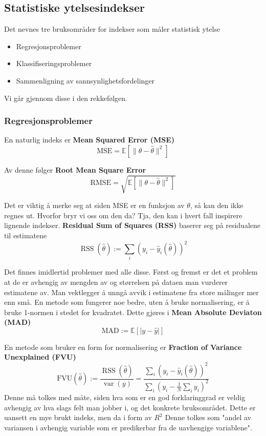 \subsection{Statistiske ytelsesindekser}
Det nevnes tre bruksområder for indekser som måler statistisk ytelse
\begin{itemize}
\item Regresjonsproblemer
\item Klassifiseringsproblemer
\item Sammenligning av sannsynlighetsfordelinger
\end{itemize}
Vi går gjennom disse i den rekkefølgen.

\subsubsection{Regresjonsproblemer}
En naturlig indeks er \textbf{Mean Squared Error (MSE)}
\begin{equation}
\textrm{MSE} = \mathbb{E}\left[\|\theta-\widehat{\theta}\|^{2}\right]
\end{equation}

Av denne følger \textbf{Root Mean Square Error}
\begin{equation}
\textrm{RMSE} = \sqrt{\mathbb{E}\left[\|\theta-\widehat{\theta}\|^{2}\right]}
\end{equation}

Det er viktig å merke seg at siden MSE er en funksjon av $\theta$, så kan den ikke regnes ut. Hvorfor bryr vi oss om den da? Tja, den kan i hvert fall inspirere lignende indekser. \textbf{Residual Sum of Squares (RSS)} baserer seg på residualene til estimatene
\begin{equation}
\operatorname{RSS}(\widehat{\theta}):=\sum_{i}\left(y_{i}-\widehat{y}_{i}(\widehat{\theta})\right)^{2}
\end{equation}

Det finnes imidlertid problemer med alle disse. Først og fremst er det et problem at de er avhengig av mengden av og størrelsen på dataen man vurderer estimatene av. Man vektlegger å unngå avvik i estimatene fra store målinger mer enn små. En metode som fungerer noe bedre, uten å bruke normalisering, er å bruke 1-normen i stedet for kvadratet. Dette gjøres i \textbf{Mean Absolute Deviaton (MAD)}
\begin{equation}
\mathrm{MAD}:=\mathbb{E}[|y-\widehat{y}|]
\end{equation}

En metode som bruker en form for normalisering er \textbf{Fraction of Variance Unexplained (FVU)}
\begin{equation}
\mathrm{FVU}(\widehat{\theta}):=\frac{\operatorname{RSS}(\widehat{\theta})}{\operatorname{var}(y)}=\frac{\sum_{i}\left(y_{i}-\widehat{y}_{i}(\widehat{\theta})\right)^{2}}{\sum_{i}\left(y_{i}-\frac{1}{N} \sum_{i} y_{i}\right)^{2}}
\end{equation}
Denne må tolkes med måte, siden hva som er en god forklaringgrad er veldig avhengig av hva slags felt man jobber i, og det konkrete bruksområdet. Dette er uansett en mye brukt indeks, men da i form av $R^{2}$
Denne tolkes som "andel av variansen i avhengig variable som er predikerbar fra de uavhengige variablene".

